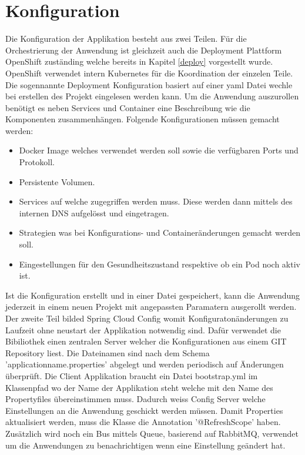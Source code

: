 \section{Konfiguration}
\label{config}

Die Konfiguration der Applikation besteht aus zwei Teilen. Für die Orchestrierung der Anwendung ist gleichzeit auch die Deployment Plattform OpenShift zuständing welche bereits in Kapitel \ref{deploy} vorgestellt wurde. OpenShift verwendet intern Kubernetes für die Koordination der einzelen Teile. Die sogennannte Deployment Konfiguration basiert auf einer yaml Datei wechle bei erstellen des Projekt eingelesen werden kann. 
Um die Anwendung  auszurollen benötigt es neben Services und Container eine Beschreibung wie die Komponenten zusammenhängen. Folgende Konfigurationen müssen gemacht werden:\newline
\begin{itemize}
	\item Docker Image welches verwendet werden soll sowie die verfügbaren Ports und Protokoll.
	\item Persistente Volumen.
	\item Services auf welche zugegriffen werden muss. Diese werden dann mittels des internen DNS aufgelösst und eingetragen.
	\item Strategien was bei Konfigurations- und Containeränderungen gemacht werden soll.
	\item Eingestellungen für den Gesundheitszustand respektive ob ein Pod noch aktiv ist.
\end{itemize}

Ist die Konfiguration erstellt und in einer Datei gespeichert, kann die Anwendung jederzeit in einem neuen Projekt mit angepassten Paramatern ausgerollt werden.\newline
Der zweite Teil bilded Spring Cloud Config womit Konfiguratonänderungen zu Laufzeit ohne neustart der Applikation notwendig sind. Dafür verwendet die Bibiliothek einen zentralen Server welcher die Konfigurationen aus einem GIT Repository liest. Die Dateinamen sind nach dem Schema 'applicationname.properties' abgelegt und werden periodisch auf Änderungen überprüft. Die Client Applikation braucht ein Datei bootstrap.yml im Klassenpfad wo der Name der Applikation steht welche mit den Name des Propertyfiles übereinstimmen muss. Dadurch weiss Config Server welche Einstellungen an die Anwendung geschickt werden müssen. Damit Properties aktualisiert werden, muss die Klasse die Annotation '@RefreshScope' haben. Zusätzlich wird noch ein Bus mittels Queue, basierend auf RabbitMQ, verwendet um die Anwendungen zu benachrichtigen wenn eine Einstellung geändert hat.

